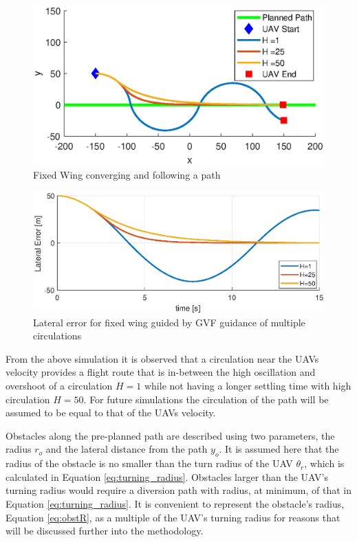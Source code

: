 \documentclass[numbered,pdftex]{ohio-etd}
\begin{document}
\begin{figure}[H]
	\centering
	\includegraphics[trim=0 30 0 65,clip,width=14cm]{PaperFigures/Methods/pathMultipleHs}
	\caption{Fixed Wing converging and following a path}
	\label{fig:uavPathMultipleHs}
\end{figure}


\begin{figure}[H]
	\centering
	\includegraphics[trim=0 0 0 0,clip,width=16cm]{PaperFigures/Methods/lateralErrorVsTime}
	\caption{Lateral error for fixed wing guided by GVF guidance of multiple circulations}
	\label{fig:uavPathMultipleHsLateral}
\end{figure}

From the above simulation it is observed that a circulation near the UAVs velocity provides a flight route that is in-between the high oscillation and overshoot of a circulation $H=1$ while not having a longer settling time with high circulation $H=50$. For future simulations the circulation of the path will be assumed to be equal to that of the UAVs velocity.


Obstacles along the pre-planned path are described using two parameters, the radius $r_o$ and the lateral distance from the path $y_o$. It is assumed here that the radius of the obstacle is no smaller than the turn radius of the UAV $\theta_r$, which is calculated in Equation \ref{eq:turning_radius}. Obstacles larger than the UAV's turning radius would require a diversion path with radius, at minimum, of that in Equation \ref{eq:turning_radius}. It is convenient to represent the obstacle's radius, Equation \ref{eq:obstR}, as a multiple of the UAV's turning radius for reasons that will be discussed further into the methodology.
\end{document}

